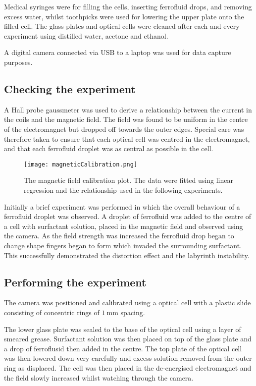 \documentclass[12pt]{article}
\begin{document}
Medical syringes were for filling the cells, inserting ferrofluid drops, and removing excess water, whilst toothpicks were used for lowering the upper plate onto the filled cell. The glass plates and optical cells were cleaned after each and every experiment using distilled water, acetone and ethanol.

A digital camera connected via USB to a laptop was used for data capture purposes.

\subsection{Checking the experiment}
A Hall probe gaussmeter was used to derive a relationship between the current in the coils and the magnetic field. The field was found to be uniform in the centre of the electromagnet but dropped off towards the outer edges. Special care was therefore taken to ensure that each optical cell was centred in the electromagnet, and that each ferrofluid droplet was as central as possible in the cell.
\begin{figure}[H]
\centering
\texttt{[image: magneticCalibration.png]}
\caption{The magnetic field calibration plot. The data were fitted using linear regression and the relationship used in the following experiments.}
\label{magneticCalibration}
\end{figure}

Initially a brief experiment was performed in which the overall behaviour of a ferrofluid droplet was observed. A droplet of ferrofluid was added to the centre of a cell with surfactant solution, placed in the magnetic field and observed using the camera. As the field strength was increased the ferrofluid drop began to change shape fingers began to form which invaded the surrounding surfactant. This successfully demonstrated the distortion effect and the labyrinth instability.\cite{labyrinth}

\subsection{Performing the experiment}
The camera was positioned and calibrated using a optical cell with a plastic slide consisting of concentric rings of $\SI{1}{\milli\metre}$ spacing.

The lower glass plate was sealed to the base of the optical cell using a layer of smeared grease. Surfactant solution was then placed on top of the glass plate and a drop of ferroflusid then added in the centre. The top plate of the optical cell was then lowered down very carefully and excess solution removed from the outer ring as displaced. The cell was then placed in the de-energised electromagnet and the field slowly increased whilst watching through the camera.
\end{document}
